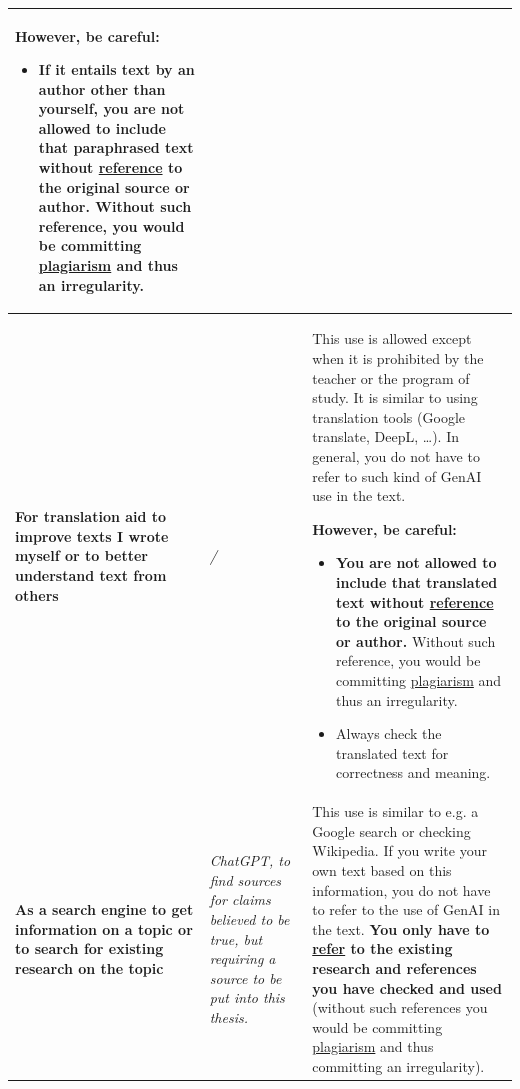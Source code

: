 \begin{longtable}{|p{}|p{}|p{}|}
\textbf{However, be careful}: 
\begin{itemize}
    \item If it entails text by an author other than yourself, \textbf{you are not allowed to include that paraphrased text without \href{https://bib.kuleuven.be/english/training-and-tutorials/citation}{reference} to the original source or author}. Without such reference, you would be committing \href{https://www.kuleuven.be/english/education/plagiarism/index}{plagiarism} and thus an irregularity.
\end{itemize} \\ \hline
\textbf{For translation aid to improve texts I wrote myself or to better understand text from others} & \textit{/} & This use is allowed except when it is prohibited by the teacher or the program of study. It is similar to using translation tools (Google translate, DeepL, …). In general, you do not have to refer to such kind of GenAI use in the text. 

\textbf{However, be careful:} 
\begin{itemize}
    \item \textbf{You are not allowed to include that translated text without \href{https://bib.kuleuven.be/english/training-and-tutorials/citation}{reference} to the original source or author.} Without such reference, you would be committing \href{https://www.kuleuven.be/english/education/plagiarism/index}{plagiarism} and thus an irregularity.
    \item Always check the translated text for correctness and meaning.
\end{itemize} \\ \hline
\textbf{As a search engine to get information on a topic or to search for existing research on the topic} & \textit{ChatGPT, to find sources for claims believed to be true, but requiring a source to be put into this thesis.} & This use is similar to e.g. a Google search or checking Wikipedia. If you write your own text based on this information, you do not have to refer to the use of GenAI in the text. \textbf{You only have to \href{https://bib.kuleuven.be/english/training-and-tutorials/citation}{refer} to the existing research and references you have checked and used }(without such references you would be committing \href{https://www.kuleuven.be/english/education/plagiarism/index}{plagiarism} and thus committing an irregularity).


\end{longtable}
